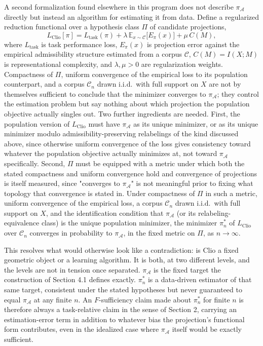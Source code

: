 \documentclass[11pt]{article}
\begin{document}
A second formalization found elsewhere in this program does not describe $\pi_{\mathcal{A}}$ directly but instead an algorithm for estimating it from data. Define a regularized reduction functional over a hypothesis class $\Pi$ of candidate projections,
\[
L_{\mathrm{Clio}}[\pi] = L_{\mathrm{task}}(\pi) + \lambda\, \mathbb{E}_{x \sim \mathcal{C}}\bigl[E_\pi(x)\bigr] + \mu\, C(M),
\]
where $L_{\mathrm{task}}$ is task performance loss, $E_\pi(x)$ is projection error against the empirical admissibility structure estimated from a corpus $\mathcal{C}$, $C(M) = I(X;M)$ is representational complexity, and $\lambda, \mu > 0$ are regularization weights. Compactness of $\Pi$, uniform convergence of the empirical loss to its population counterpart, and a corpus $\mathcal{C}_n$ drawn i.i.d.\ with full support on $X$ are not by themselves sufficient to conclude that the minimizer converges to $\pi_{\mathcal{A}}$; they control the estimation problem but say nothing about which projection the population objective actually singles out. Two further ingredients are needed. First, the population version of $L_{\mathrm{Clio}}$ must have $\pi_{\mathcal{A}}$ as its unique minimizer, or as its unique minimizer modulo admissibility-preserving relabelings of the kind discussed above, since otherwise uniform convergence of the loss gives consistency toward whatever the population objective actually minimizes at, not toward $\pi_{\mathcal{A}}$ specifically. Second, $\Pi$ must be equipped with a metric under which both the stated compactness and uniform convergence hold and convergence of projections is itself measured, since "converges to $\pi_{\mathcal{A}}$" is not meaningful prior to fixing what topology that convergence is stated in. Under compactness of $\Pi$ in such a metric, uniform convergence of the empirical loss, a corpus $\mathcal{C}_n$ drawn i.i.d.\ with full support on $X$, and the identification condition that $\pi_{\mathcal{A}}$ (or its relabeling-equivalence class) is the unique population minimizer, the minimizer $\pi_n^{*}$ of $L_{\mathrm{Clio}}$ over $\mathcal{C}_n$ converges in probability to $\pi_{\mathcal{A}}$, in the fixed metric on $\Pi$, as $n \to \infty$.

This resolves what would otherwise look like a contradiction: is Clio a fixed geometric object or a learning algorithm. It is both, at two different levels, and the levels are not in tension once separated. $\pi_{\mathcal{A}}$ is the fixed target the construction of Section 4.1 defines exactly. $\pi_n^{*}$ is a data-driven estimator of that same target, consistent under the stated hypotheses but never guaranteed to equal $\pi_{\mathcal{A}}$ at any finite $n$. An $F$-sufficiency claim made about $\pi_n^{*}$ for finite $n$ is therefore always a task-relative claim in the sense of Section 2, carrying an estimation-error term in addition to whatever bias the projection's functional form contributes, even in the idealized case where $\pi_{\mathcal{A}}$ itself would be exactly sufficient.
\end{document}
